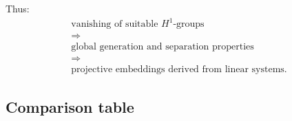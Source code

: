 \documentclass[12pt,a4paper]{article}
\theoremstyle{notespace}
\begin{document}
Thus:
\[
\boxed{
	\begin{array}{c}
		\text{vanishing of suitable }H^{1}\text{-groups}
		\\[3pt]
		\Longrightarrow
		\\[3pt]
		\text{global generation and separation properties}
		\\[3pt]
		\Longrightarrow
		\\[3pt]
		\text{projective embeddings derived from linear systems.}
	\end{array}
}
\]

\subsection{Comparison table}
\end{document}
